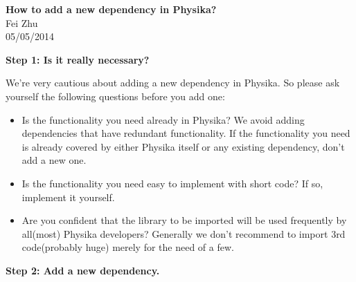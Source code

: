 \documentclass[11pt,fullpage]{article}
\newcommand{\subheading}[1]{\noindent \textbf{#1}}
\begin{document}
\noindent
\begin{center}
{\bf\large  How to add a new dependency in Physika?}
{\\ Fei Zhu \\ 05/05/2014}
\end{center}

\subheading{Step 1: Is it really necessary?}

\noindent{}We're very cautious about adding a new dependency in
Physika. So please ask yourself the following questions before you add one:
\begin{itemize}
\item{Is the functionality you need already in Physika? We avoid
    adding dependencies that have redundant functionality. If the
    functionality you need is already covered by either Physika itself or
    any existing dependency, don't add a new one.}
\item{Is the functionality you need easy to implement with short code? If so,
    implement it yourself.}
\item{Are you confident that the library to be imported will be used frequently by
    all(most) Physika developers? Generally we don't recommend to import
    3rd code(probably huge) merely for the need of a few.}
\end{itemize}

\subheading{Step 2: Add a new dependency.}
\end{document}
